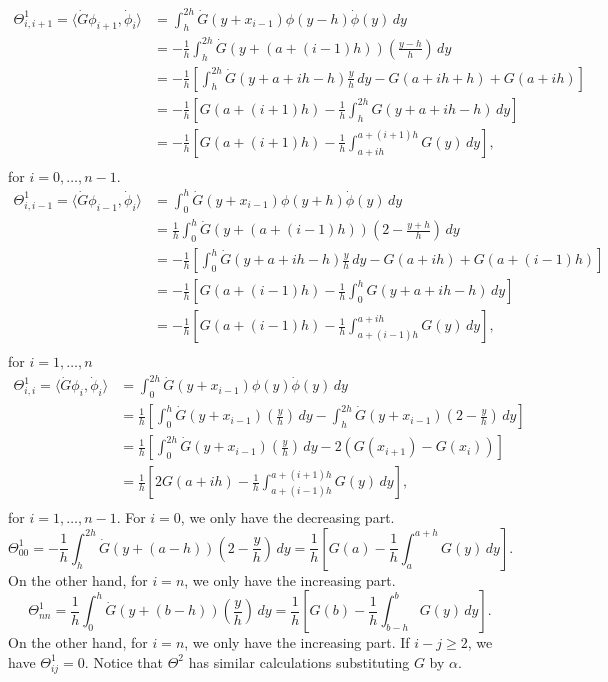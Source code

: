 \documentclass[12pt]{article}
\newcommand{\inner}[2]{\langle{} #1, #2 \rangle{}}
\theoremstyle{definition}
\begin{document}
\[
\begin{split}
    \Theta^1_{i,i+1} = \inner{\dot{G} \phi_{i+1}}{\dot\phi_{i}} &= \int_h^{2h} \dot{G}(y+x_{i-1})\phi(y-h)\dot\phi(y) \, dy \\
    &= -\frac{1}{h}\int_h^{2h} \dot{G}(y + (a+(i-1)h))\left(\frac{y-h}{h}\right) \, dy \\
    &= -\frac{1}{h}\left[\int_h^{2h} \dot{G}(y + a+ih-h)\frac{y}{h} \, dy - G(a + ih+h) + G(a + ih)  \right] \\
    &= -\frac{1}{h}\left[G(a + (i+1)h) - \frac{1}{h}\int_h^{2h} G(y+a+ih-h) \, dy \right] \\
    &= -\frac{1}{h}\left[G(a + (i+1)h) - \frac{1}{h}\int_{a+ih}^{a+(i+1)h} G(y) \, dy \right], \\
\end{split}    
\]
for $i=0,\dots,n-1$.
\[
\begin{split}
    \Theta^1_{i,i-1} = \inner{\dot{G} \phi_{i-1}}{\dot\phi_{i}} &= \int_0^{h} \dot{G}(y+x_{i-1})\phi(y+h)\dot\phi(y) \, dy \\
    &= \frac{1}{h}\int_0^{h} \dot{G}(y + (a+(i-1)h))\left(2-\frac{y+h}{h}\right) \, dy \\
    &= -\frac{1}{h}\left[\int_0^{h} \dot{G}(y + a+ih-h)\frac{y}{h} \, dy - G(a + ih) + G(a + (i-1)h)  \right] \\
    &= -\frac{1}{h}\left[G(a + (i-1)h) - \frac{1}{h}\int_0^{h} G(y+a+ih-h) \, dy \right] \\
    &= -\frac{1}{h}\left[G(a + (i-1)h) - \frac{1}{h}\int_{a+(i-1)h}^{a+ih} G(y) \, dy \right], \\
\end{split}    
\]
for $i=1,\dots,n$
\[
\begin{split}
    \Theta^1_{i,i} = \inner{\dot{G} \phi_{i}}{\dot\phi_{i}} &= \int_0^{2h} \dot{G}(y+x_{i-1})\phi(y)\dot\phi(y) \, dy \\
    &= \frac{1}{h} \left[\int_0^h \dot{G}(y+x_{i-1})\left(\frac{y}{h}\right) \, dy- \int_h^{2h} \dot{G}(y+x_{i-1})\left(2-\frac{y}{h}\right) \, dy \right] \\
    &= \frac{1}{h} \left[\int_0^{2h} \dot{G}(y+x_{i-1})\left(\frac{y}{h}\right) \, dy - 2(G(x_{i+1}) - G(x_i)) \right] \\
    &= \frac{1}{h} \left[2G(a+ih) - \frac{1}{h}\int_{a+(i-1)h}^{a+(i+1)h} G(y) \, dy \right], \\
\end{split}
\]
for $i=1,\dots,n-1$. 
For $i=0$, we only have the decreasing part.
\[
\Theta^1_{00} = -\frac{1}{h} \int_h^{2h} \dot{G}(y+(a-h))\left(2-\frac{y}{h}\right) \, dy = \frac{1}{h}\left[G(a)-\frac{1}{h}\int_a^{a+h} G(y) \, dy\right].
\]
On the other hand, for $i = n$, we only have the increasing part.
\[
\Theta^1_{nn} = \frac{1}{h} \int_0^{h} \dot{G}(y+(b-h))\left(\frac{y}{h}\right) \, dy = \frac{1}{h}\left[G(b) - \frac{1}{h}\int_{b-h}^b G(y) \, dy\right].
\]
On the other hand, for $i = n$, we only have the increasing part.
If $i - j \ge 2$, we have $\Theta_{ij}^1 = 0$.
Notice that $\Theta^2$ has similar calculations substituting $G$ by $\alpha$.
\end{document}
